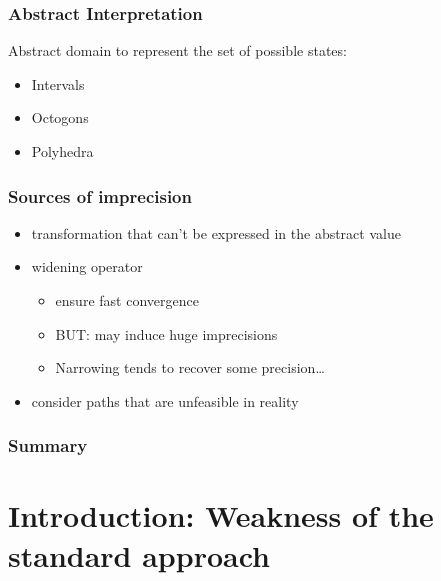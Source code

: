 \documentclass{beamer}
\begin{document}
\begin{frame}
\frametitle{Abstract Interpretation}

Abstract domain to represent the set of possible states:
\begin{itemize}
\item Intervals
\item Octogons
\item Polyhedra
\end{itemize}

\bigskip

\end{frame}


\begin{frame}
\frametitle{Sources of imprecision}
\begin{itemize}
\item<1-> transformation that can't be expressed in the abstract value
\item<2-> \alert<4>{widening operator}
\begin{itemize}
\item ensure fast convergence
\item BUT: may induce huge imprecisions
\item Narrowing tends to recover some precision\ldots
\end{itemize}
\item<3-> \alert<4>{consider paths that are unfeasible in reality}
\end{itemize}
\end{frame}

\begin{frame}
\frametitle{Summary}
\tableofcontents
\end{frame}

\section[Introduction]{Introduction: Weakness of the standard approach}
\end{document}

